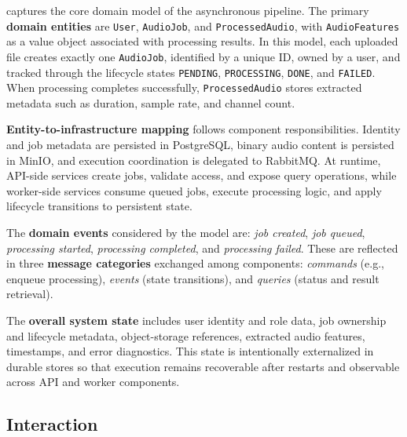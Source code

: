 \documentclass{scrartcl}
\begin{document}
 captures the core domain model of the asynchronous pipeline.
The primary \textbf{domain entities} are \texttt{User}, \texttt{AudioJob}, and \texttt{ProcessedAudio}, with \texttt{AudioFeatures} as a value object associated with processing results.
In this model, each uploaded file creates exactly one \texttt{AudioJob}, identified by a unique ID, owned by a user, and tracked through the lifecycle states
\texttt{PENDING}, \texttt{PROCESSING}, \texttt{DONE}, and \texttt{FAILED}.
When processing completes successfully, \texttt{ProcessedAudio} stores extracted metadata such as duration, sample rate, and channel count.

\textbf{Entity-to-infrastructure mapping} follows component responsibilities.
Identity and job metadata are persisted in PostgreSQL, binary audio content is persisted in MinIO, and execution coordination is delegated to RabbitMQ.
At runtime, API-side services create jobs, validate access, and expose query operations, while worker-side services consume queued jobs,
execute processing logic, and apply lifecycle transitions to persistent state.

The \textbf{domain events} considered by the model are: \emph{job created}, \emph{job queued}, \emph{processing started}, \emph{processing completed}, and \emph{processing failed}.
These are reflected in three \textbf{message categories} exchanged among components:
\emph{commands} (e.g., enqueue processing), \emph{events} (state transitions), and \emph{queries} (status and result retrieval).

The \textbf{overall system state} includes user identity and role data, job ownership and lifecycle metadata,
object-storage references, extracted audio features, timestamps, and error diagnostics.
This state is intentionally externalized in durable stores so that execution remains recoverable after restarts
and observable across API and worker components.


\subsection{Interaction}\label{interaction}

\end{document}
